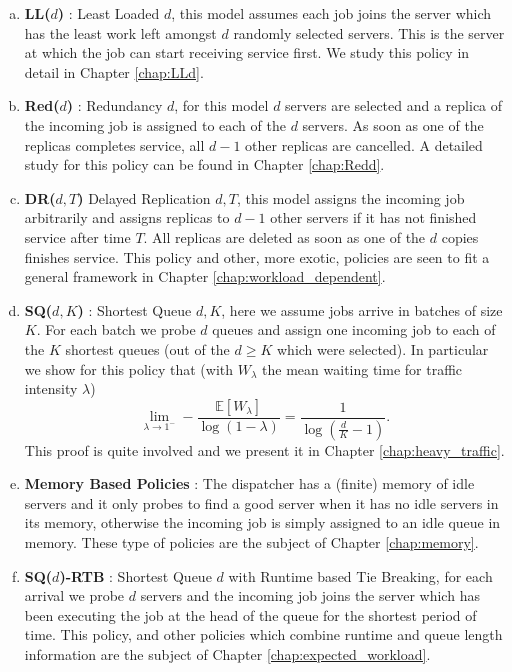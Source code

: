 \documentclass[12pt]{report}
\newcommand{\E}{\mathbb{E}}
\begin{document}
\begin{enumerate}[(a)]
	\item \textbf{LL($d$)} : Least Loaded $d$, this model assumes each job joins the server which has the least work left amongst $d$ randomly selected servers. This is the server at which the job can start receiving service first. We study this policy in detail in Chapter \ref{chap:LLd}.
	\item \textbf{Red($d$)} : Redundancy $d$, for this model $d$ servers are selected and a replica of the incoming job is assigned to each of the $d$ servers. As soon as one of the replicas completes service, all $d-1$ other replicas are cancelled. A detailed study for this policy can be found in Chapter \ref{chap:Redd}.
	\item \textbf{DR($d,T$)} Delayed Replication $d, T$, this model assigns the incoming job arbitrarily and assigns replicas to $d-1$ other servers if it has not finished service after time $T$. All replicas are deleted as soon as one of the $d$ copies finishes service. This policy and other, more exotic, policies are seen to fit a general framework in Chapter \ref{chap:workload_dependent}.
	\item \textbf{SQ($d,K$)} : Shortest Queue $d, K$, here we assume jobs arrive in batches of size $K$. For each batch we probe $d$ queues and assign one incoming job to each of the $K$ shortest queues (out of the $d \geq K$ which were selected). In particular we show for this policy that (with $W_\lambda$ the mean waiting time for traffic intensity $\lambda$) 
	$$
	\lim_{\lambda\rightarrow 1^-} - \frac{\E[W_\lambda]}{\log(1-\lambda)} = \frac{1}{\log\left( \frac{d}{K} - 1 \right)}.
	$$
	This proof is quite involved and we present it in Chapter \ref{chap:heavy_traffic}.
	\item \textbf{Memory Based Policies} : The dispatcher has a (finite) memory of idle servers and it only probes to find a good server when it has no idle servers in its memory, otherwise the incoming job is simply assigned to an idle queue in memory. These type of policies are the subject of Chapter \ref{chap:memory}.
	\item \textbf{SQ($d$)-RTB} : Shortest Queue $d$ with Runtime based Tie Breaking, for each arrival we probe $d$ servers and the incoming job joins the server which has been executing the job at the head of the queue for the shortest period of time. This policy, and other policies which combine runtime and queue length information are the subject of Chapter \ref{chap:expected_workload}.
\end{enumerate}
\end{document}
